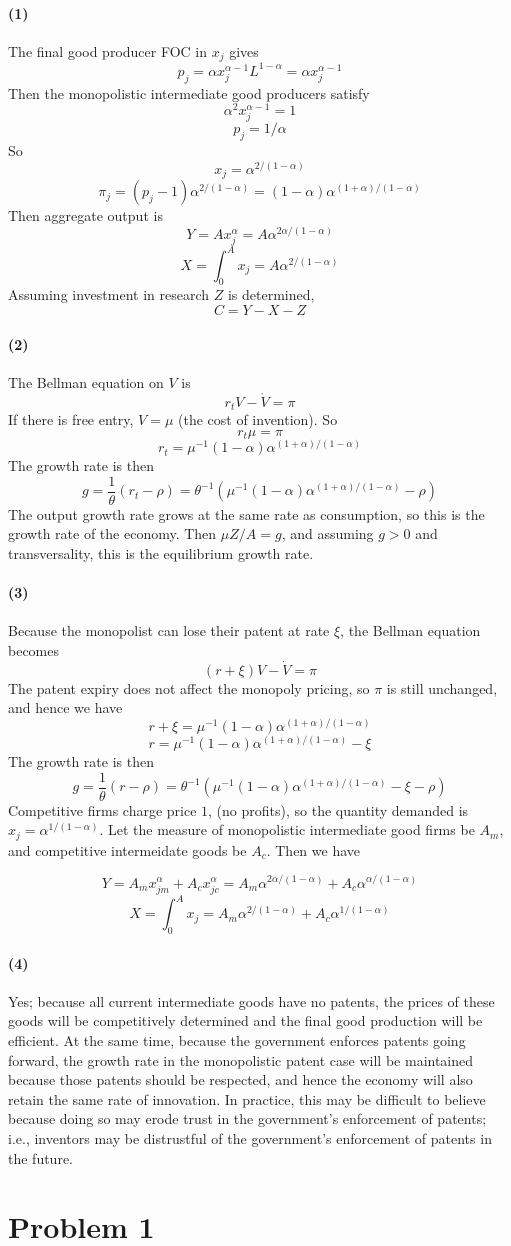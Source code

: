 \documentclass[10pt,letter]{article}
\newcommand{\problem}[1]{\section*{Problem #1}}
\newcommand{\problempart}[1]{\paragraph{#1}}
\begin{document}
\problempart{(1)}
The final good producer FOC in $x_j$ gives
\[ p_j = \alpha x_j^{\alpha - 1}L^{1-\alpha} = \alpha x_j^{\alpha - 1} \]
Then the monopolistic intermediate good producers satisfy
\[ \alpha^2 x_j^{\alpha - 1} = 1 \]
\[ p_j = 1/\alpha \]
So
\[ x_j = \alpha^{2/(1-\alpha)} \]
\[ \pi_j = (p_j - 1) \alpha^{2/(1-\alpha)} = (1-\alpha)\alpha^{(1+\alpha)/(1-\alpha)} \]
Then aggregate output is
\[ Y = A x_j^\alpha = A \alpha^{2\alpha/(1-\alpha)}\]
\[ X = \int_0^A x_j = A\alpha^{2/(1-\alpha)} \]
Assuming investment in research $Z$ is determined,
\[ C = Y - X - Z\]
\problempart{(2)}
The Bellman equation on $V$ is
\[ r_t V - \dot{V} = \pi \]
If there is free entry, $V = \mu$ (the cost of invention). So
\[ r_t \mu = \pi \]
\[ r_t = \mu^{-1}(1-\alpha)\alpha^{(1+\alpha)/(1-\alpha)} \]
The growth rate is then
\[ g = \frac{1}{\theta}(r_t - \rho) = \theta^{-1}(\mu^{-1}(1-\alpha)\alpha^{(1+\alpha)/(1-\alpha)} - \rho) \]
The output growth rate grows at the same rate as consumption, so this is the growth rate of the economy. Then $\mu Z/ A = g$, and assuming $g > 0$ and transversality, this is the equilibrium growth rate.
\problempart{(3)}
Because the monopolist can lose their patent at rate $\xi$, the Bellman equation becomes
\[ (r + \xi)V - \dot{V} = \pi \]
The patent expiry does not affect the monopoly pricing, so $\pi$ is still unchanged, and hence we have
\[ r + \xi = \mu^{-1}(1-\alpha)\alpha^{(1+\alpha)/(1-\alpha)} \]
\[ r = \mu^{-1}(1-\alpha)\alpha^{(1+\alpha)/(1-\alpha)} - \xi \]
The growth rate is then
\[ g = \frac{1}{\theta}(r - \rho) = \theta^{-1}(\mu^{-1}(1-\alpha)\alpha^{(1+\alpha)/(1-\alpha)} - \xi - \rho)\]
Competitive firms charge price $1$, (no profits), so the quantity demanded is $x_j = \alpha^{1/(1-\alpha)}$. Let the measure of monopolistic intermediate good firms be $A_m$, and competitive intermeidate goods be $A_c$. Then we have

\[ Y = A_m x_{jm}^\alpha + A_c x_{jc}^\alpha = A_m \alpha^{2\alpha/(1-\alpha)} + A_c \alpha^{\alpha/(1-\alpha)}\]
\[ X = \int_0^A x_j = A_m \alpha^{2/(1-\alpha)} + A_c \alpha^{1/(1-\alpha)}  \]

\problempart{(4)}
Yes; because all current intermediate goods have no patents, the prices of these goods will be competitively determined and the final good production will be efficient. At the same time, because the government enforces patents going forward, the growth rate in the monopolistic patent case will be maintained because those patents should be respected, and hence the economy will also retain the same rate of innovation. In practice, this may be difficult to believe because doing so may erode trust in the government's enforcement of patents; i.e., inventors may be distrustful of the government's enforcement of patents in the future.
\pagebreak
\problem{1}
\end{document}

